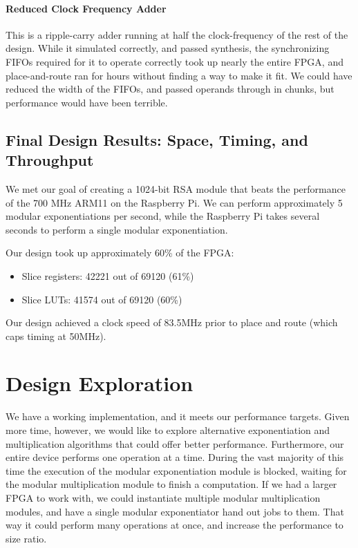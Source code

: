 \documentclass[a4paper,11pt]{report}
\begin{document}
\subsubsection{Reduced Clock Frequency Adder}
This is a ripple-carry adder running at half the clock-frequency of the rest of the design.
While it simulated correctly, and passed synthesis,
the synchronizing FIFOs required for it to operate correctly took up nearly the entire FPGA,
and place-and-route ran for hours without finding a way to make it fit.
We could have reduced the width of the FIFOs, and passed operands through in chunks,
but performance would have been terrible.


\section{Final Design Results: Space, Timing, and Throughput}

We met our goal of creating a 1024-bit RSA module that beats the performance of the 700 MHz ARM11 on the Raspberry Pi.
We can perform approximately 5 modular exponentiations per second,
while the Raspberry Pi takes several seconds to perform a single modular exponentiation.

Our design took up approximately 60\% of the FPGA:

\begin{itemize}
\item Slice registers: 42221 out of 69120  (61\%) 
\item Slice LUTs: 41574 out of 69120 (60\%)
\end{itemize}

Our design achieved a clock speed of 83.5MHz prior to place and route (which caps timing at 50MHz).




\chapter*{Design Exploration}

We have a working implementation, and it meets our performance targets.
Given more time, however, we would like to explore alternative exponentiation
and multiplication algorithms that could offer better performance.
Furthermore, our entire device performs one operation at a time.
During the vast majority of this time the execution of the modular exponentiation
module is blocked, waiting for the modular multiplication module to finish a computation.
If we had a larger FPGA to work with, we could instantiate multiple
modular multiplication modules, and have a single modular exponentiator hand out jobs to them.
That way it could perform many operations at once, and increase the performance to size ratio.
\end{document}
